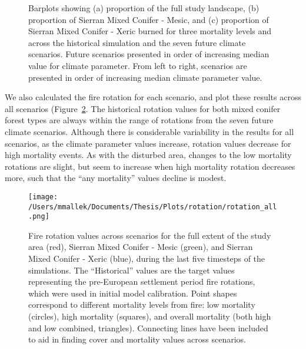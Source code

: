 \begin{figure}[!htbp]
  \centering


    \caption{Barplots showing (a) proportion of the full study landscape, (b) proportion of Sierran Mixed Conifer - Mesic, and (c) proportion of Sierran Mixed Conifer - Xeric burned for three mortality levels and across the historical simulation and the seven future climate scenarios. Future scenarios presented in order of increasing median value for climate parameter. From left to right, scenarios are presented in order of increasing median climate parameter value.}
  \label{fig:dareacomp}
\end{figure}

We also calculated the fire rotation for each scenario, and plot these results across all scenarios (Figure~\ref{fig:frotation}. The historical rotation values for both mixed conifer forest types are always within the range of rotations from the seven future climate scenarios. Although there is considerable variability in the results for all scenarios, as the climate parameter values increase, rotation values decrease for high mortality events. As with the disturbed area, changes to the low mortality rotations are slight, but seem to increase when high mortality rotation decreases more, such that the ``any mortality'' values decline is modest.



\begin{figure}
\centering
\texttt{[image: /Users/mmallek/Documents/Thesis/Plots/rotation/rotation\_all.png]}
\caption{Fire rotation values across scenarios for the full extent of the study area (red), Sierran Mixed Conifer - Mesic (green), and Sierran Mixed Conifer - Xeric (blue), during the last five timesteps of the simulations. The ``Historical'' values are the target values representing the pre-European settlement period fire rotations, which were used in initial model calibration. Point shapes correspond to different mortality levels from fire: low mortality (circles), high mortality (squares), and overall mortality (both high and low combined, triangles). Connecting lines have been included to aid in finding cover and mortality values across scenarios.}
\label{fig:frotation}
\end{figure}



